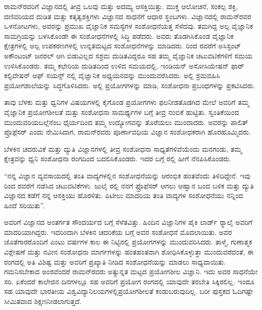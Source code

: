 ರಾಮನ್‍ರವರಿಗೆ ವಿಜ್ಞಾನದಲ್ಲಿ ತೀವ್ರ ಒಲವು ಮತ್ತು ಅದಮ್ಯ ಆಸಕ್ತಿಯಿತ್ತು. ಮುಕ್ತ ಆಲೋಚನೆ, ಸಂಕಲ್ಪ ಶಕ್ತಿ, ದಣಿವರಿಯದ ದುಡಿತ ಮತ್ತು ಕತೃತ್ವಶಕ್ತಿಗಳು ವಿಜ್ಞಾನದ ಸಾಧನೆಗೆ ಆಧಾರ ಸ್ಥಂಬಗಳು. ವಿಜ್ಞಾನದಲ್ಲಿ ರಾಮನ್‍ರವರ ಒಳನೋಟಗಳು, ಅವರನ್ನು ಪ್ರಮುಖ ವೈಜ್ಞಾನಿಕ ಸಮಸ್ಯೆಗಳ ಸಂಶೋಧನೆಯತ್ತ ಸೆಳೆದವು. ತಮಗಿದ್ದ ಅಲ್ಪ ವೈಜ್ಞಾನಿಕ ಸಾಮಗ್ರಿಯನ್ನು ಬಳಸಿಕೊಂಡೇ ಈ ಸಂಶೋಧನೆಗಳಲ್ಲಿ ಸಿದ್ಧಿ ಪಡೆದರು. ಅವರು ತೊಡಗಿಸಿಕೊಂಡ ವೈಜ್ಞಾನಿಕ ಕ್ಷೇತ್ರಗಳಲ್ಲಿ ಅಲ್ಪ ಉಪಕರಣಗಳಲ್ಲಿ ಉನ್ನತಮಟ್ಟದ ಸಂಶೋಧನೆಗಳನ್ನು ಮಾಡಿದರು.  ರಿಂದ ರವರೆಗೆ ಅಸಿಸ್ಟಂಟ್ ಅಕೌಂಟಂಟ್ ಜನರಲ್ ಆಗಿ ಬಿಡುವಿಲ್ಲದ ಸಶ್ರಮ ದುಡಿತವಿದ್ದರೂ ಸಹ ತಮ್ಮ ವೈಜ್ಞಾನಿಕ ಚಟುವಟಿಕೆಗಳಿಗೆ ಸಮಯ ಉಳಿಸಿಕೊಂಡರು. ತಮ್ಮ ಕಛೇರಿಯ ದುಡಿತದಿಂದ ಉಳಿದ ಸಮಯದಲ್ಲಿ, ಇಂಡಿಯನ್ ಅಸೋಸಿಯೇಷನ್ ಫಾರ್ ಕಲ್ಟಿವೇಷನ್ ಆಫ್ ಸಯನ್ಸ್ ನಲ್ಲಿ ವೈಜ್ಞಾನಿಕ ಅಧ್ಯಯನವನ್ನು ಮುಂದುವರೆಸಿದರು. ಅಲ್ಲಿ ಶ್ರಮವಹಿಸಿ ಪ್ರಯೋಗಶಾಲೆಯನ್ನು ಸಿದ್ಧಗೊಳಿಸಿದರು. ಅಲ್ಲಿ ಪ್ರಯೋಗಗಳನ್ನು ಮಾಡಿ, ಸಂಶೋಧನಾ ಪ್ರಬಂಧಗಳನ್ನು ಪ್ರಕಟಿಸಿದರು.

ತಾವು ಬೆಳಕು ಮತ್ತು ಧ್ವನಿಗಳ ವಿಷಯಗಳಲ್ಲಿ ಕೈಗೊಂಡ ಪ್ರಯೋಗಗಳು ಫಲನೀಡತೊಡಗಿದ ಮೇಲೆ ಅವರಿಗೆ ತಮ್ಮ ವೈಜ್ಞಾನಿಕ ಪ್ರಯೋಗಶೀಲತೆ ಮತ್ತು ಸಂಶೋಧನಾ ಸಾಮರ್ಥ್ಯಗಳ ಬಗ್ಗೆ ತೀವ್ರ ನಂಬಿಕೆ ಹುಟ್ಟಿತು. ಸ್ವಂತಿಕೆಯಿಂದ ಮುಂದುವರಿಯಬಲ್ಲೆನೆಂಬ ಧೈರ್ಯದಿಂದ ತಮ್ಮ ಉದ್ಯೋಗವನ್ನು ತೊರೆಯಲು ಮುಂದಾದರು. ಅವರನ್ನು ಪಾಲಿತ್ ಪ್ರೊಫೆ಼ಸರ್ ಎಂದು ನೇಮಿಸಿದಾಗ, ರಾಮನ್‍ರವರು ಪೂರ್ಣಾವಧಿಯ ವಿಜ್ಞಾನ ಸಂಶೋಧಕರಾಗಿ ಹೊರಹೊಮ್ಮಿದರು.

ಬೆಳಕಿನ ಚದರುವಿಕೆ ಮತ್ತು ದ್ಯುತಿ ವಿಜ್ಞಾನಗಳಲ್ಲಿ ತೀವ್ರ ಸಂಶೋಧನಾ ಸಾಧ್ಯತೆಗಳಿವೆಯೆಂದು ಮನಗಂಡು, ತಮ್ಮ ಕ್ಷೇತ್ರವನ್ನು ಧ್ವನಿ ಸಂಶೋಧನಾ ರಂಗದಿಂದ ಬದಲಿಸಿಕೊಂಡರು. ಇದರ ಬಗ್ಗೆ ರಲ್ಲಿ ಹೀಗೆ ನೆನಪಿಸಿಕೊಂಡರು.

\newpage

“ನನ್ನ ವಿಜ್ಞಾನ ವ್ಯವಸಾಯದಲ್ಲಿ ತಂತಿ ವಾದ್ಯಗಳಲ್ಲಿನ ಸಂಶೋಧನೆಯನ್ನು ಆರಂಭಿಕ ಹಂತ\break ವೆಂದು ತಿಳಿದಿದ್ದೇನೆ. ಇವು  ರಿಂದ  ರವರೆಗೆ ನಡೆಸಿದ ಚಟುವಟಿಕೆಗಳು. ಜುಲೈ ರಲ್ಲಿ ನನಗೆ ಫ್ರೊಫೆಸರ್ ಆಗಲು ಆಹ್ವಾನ ಬಂದ ಬಳಿಕ ಮತ್ತು ದ್ಯುತಿ ವಿಜ್ಞಾನದ ಕಡೆಗೆ ನನ್ನ ಆಸಕ್ತಿಯು ಹೊರಳಿತು. ಪಿಟೀಲು ಮಾದರಿಯ ತಂತಿ ವಾದ್ಯಗಳ ಸಂಶೋಧನೆಯು ನನ್ನಿಂದ ಹಿಂದೆ ಸರಿಯಿತು”.

ಅವರಿಗೆ ವಿಜ್ಞಾನದ ಅಂತರ್ಗತ ಸೌಂದರ್ಯದ ಬಗ್ಗೆ ಸೆಳೆತವಿತ್ತು. ಹಿಂದಿನ ವಿಜ್ಞಾನಿಗಳ ಪೈಕಿ ಲಾರ್ಡ್ ರ‍್ಯಾಲೈ ಅವರಿಗೆ ಮಾದರಿಯಾಗಿದ್ದರು. ಇದರಿಂದಾಗಿ ಬೆಳಕಿನ ಚದರಿಕೆಯ ಬಗ್ಗೆ ಅವರ ಸಂಶೋಧನೆ ಮೊದಲಾಯಿತು. ಅವರ ಜೊತೆಗಾರರೊಂದಿಗೆ ಎಂಟು ವರ್ಷಗಳ ಕಾಲ ಈ ನಿಟ್ಟಿನಲ್ಲಿ ಪ್ರಯೋಗಗಳನ್ನು ಮುಂದುವರಿಸಿದರು. ತಾಳ್ಮೆ, ಗುಣಾತ್ಮಕ ವಿಶ್ಲೇಷಣೆ ಮತ್ತು ನವೀನ ಸಂಶೋಧನಾ ಮಾರ್ಗಗಳನ್ನು ಹಂತಹಂತವಾಗಿ ಶೋಧಿಸಿಕೊಳ್ಳುತ್ತಾ ಮುಂದುವರೆದಂತೆ, ಈ ರಂಗದಲ್ಲಿ ಅತಿ ವಿಶಿಷ್ಟ ಮತ್ತು ಅವರಿಗೆ ಪ್ರಖ್ಯಾತಿ ನೀಡಿದ ಸಂಶೋಧನೆಯನ್ನು ಮಾಡಲು ಸಾಧ್ಯವಾಯಿತು. ಗಮನಿಸಬೇಕಾದ ಅಂಶವೆಂದರೆ ರಾಮನ್‍ರವರು ಅತ್ಯುನ್ನತ ಮಟ್ಟದ ಪ್ರಯೋಗಶೀಲ ವಿಜ್ಞಾನಿ. ಇದು ಅವರ ಸಾಧನೆಯೇ ಸರಿ. ಏಕೆಂದರೆ ಕಾಲೇಜಿನ ದಿನಗಳಲ್ಲೂ ಸಹ ಅವರಿಗೆ ಪ್ರಯೋಗ ರಂಗದಲ್ಲಿ ಯಾವುದೇ ತರಬೇತಿ ಸಿಕ್ಕಿರಲಿಲ್ಲ. ಇಂದೂ ಸಹ ಯಾವುದೇ ಭಾರತೀಯ ವಿಶ್ವವಿದ್ಯಾನಿಲಯಗಳಲ್ಲಿ\break  ಪ್ರಯೋಗಶೀಲತೆ ಕಂಡುಬರುವುದಿಲ್ಲ. ಬರೀ ಪುಸ್ತಕದ ಓದಿಗಷ್ಟೇ ಸೀಮಿತವಾದ ಶಿಕ್ಷಣ\break ನೀಡಲಾಗುತ್ತದೆ.

